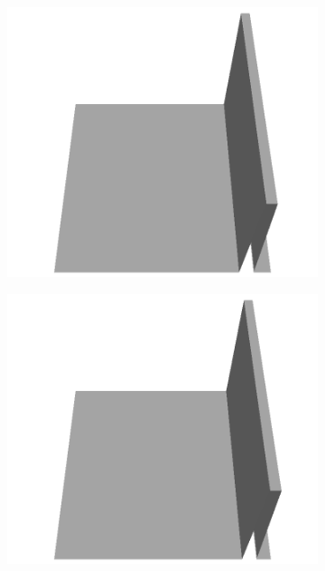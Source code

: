 \documentclass[../document.tex]{subfiles}
\begin{document}
\begin{figure}[H]
\begin{subfigure}[b]{0.065\textwidth}
    \includegraphics[width=\linewidth]{../img/5/custom_patches/walls_front/all/13-3d.png}
    \end{subfigure}
    \begin{subfigure}[b]{0.065\textwidth}
    \includegraphics[width=\linewidth]{../img/5/custom_patches/walls_front/all/12-3d.png}
    \end{subfigure}
    \begin{subfigure}[b]{0.065\textwidth}

\end{subfigure}
\end{figure}
\end{document}
